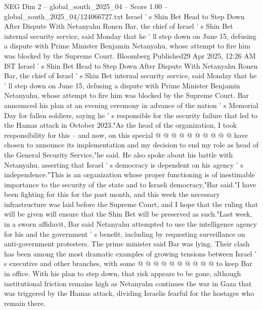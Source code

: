 \begin{textsample}{NEG Dim 2 – global\_south\_2025\_04 – Score 1.00 – global\_south\_2025\_04/124066727.txt}  \label{ex:f2_neg_173}
Israel ' s Shin Bet Head to Step Down After Dispute With Netanyahu Ronen Bar, the chief of Israel ' s Shin Bet internal security service, said Monday that he ' ll step down on June 15, defusing a dispute with Prime Minister Benjamin Netanyahu, whose attempt to fire him was blocked by the Supreme Court.
Bloomberg Published29 Apr 2025, 12:26 AM IST Israel ' s Shin Bet Head to Step Down After Dispute With Netanyahu Ronen Bar, the chief of Israel ' s Shin Bet internal security service, said Monday that he ' ll step down on June 15, defusing a dispute with Prime Minister Benjamin Netanyahu, whose attempt to fire him was blocked by the Supreme Court.
Bar announced his plan at an evening ceremony in advance of the nation ' s Memorial Day for fallen soldiers, saying he ' s responsible for the security failure that led to the Hamas attack in October 2023."As the head of the organization, I took responsibility for this -- and now, on this special @ @ @ @ @ @ @ @ @ @ have chosen to announce its implementation and my decision to end my role as head of the General Security Service,"he said.
He also spoke about his battle with Netanyahu, asserting that Israel ' s democracy is dependent on his agency ' s independence."This is an organization whose proper functioning is of inestimable importance to the security of the state and to Israeli democracy,"Bar said."I have been fighting for this for the past month, and this week the necessary infrastructure was laid before the Supreme Court, and I hope that the ruling that will be given will ensure that the Shin Bet will be preserved as such."Last week, in a sworn affidavit, Bar said Netanyahu attempted to use the intelligence agency for his and the government ' s benefit, including by requesting surveillance on anti-government protesters.
The prime minister said Bar was lying.
Their clash has been among the most dramatic examples of growing tensions between Israel ' s executive and other branches, with some @ @ @ @ @ @ @ @ @ @ to keep Bar in office.
With his plan to step down, that risk appears to be gone, although institutional friction remains high as Netanyahu continues the war in Gaza that was triggered by the Hamas attack, dividing Israelis fearful for the hostages who remain there.

\end{textsample}
